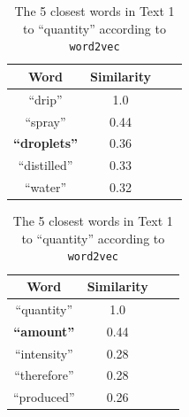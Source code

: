 \documentclass[12pt]{article}
\newcommand{\wordvec}{\texttt{word2vec}}
\begin{document}
\begin{table}
\parbox{.45\linewidth}{
\centering
\begin{tabular}{|c|c|c|c|} 
     \hline
     Word & Similarity\\ [0.5ex] 
     \hline\hline
    ``drip'' & 1.0 \\
     \hline
    ``spray'' & 0.44 \\
     \hline
    \bf{``droplets''} & 0.36 \\
     \hline
    ``distilled'' & 0.33 \\
     \hline
    ``water'' & 0.32 \\
     \hline
    \end{tabular}
    \caption{The 5 closest words in Text 1 to ``drip'' according to \wordvec} \label{table:drip}
}
\hfill
\parbox{.45\linewidth}{
\centering
\begin{tabular}{|c|c|c|c|} 
     \hline
     Word & Similarity\\ [0.5ex] 
     \hline\hline
    ``quantity'' & 1.0 \\
     \hline
    \bf{``amount''} & 0.44 \\
     \hline
    ``intensity'' & 0.28 \\
     \hline
    ``therefore'' & 0.28 \\
     \hline
    ``produced'' & 0.26 \\
     \hline
    \end{tabular}
    \caption{The 5 closest words in Text 1 to ``quantity'' according to \wordvec} \label{table:quantity}
}
\end{table}
\end{document}
